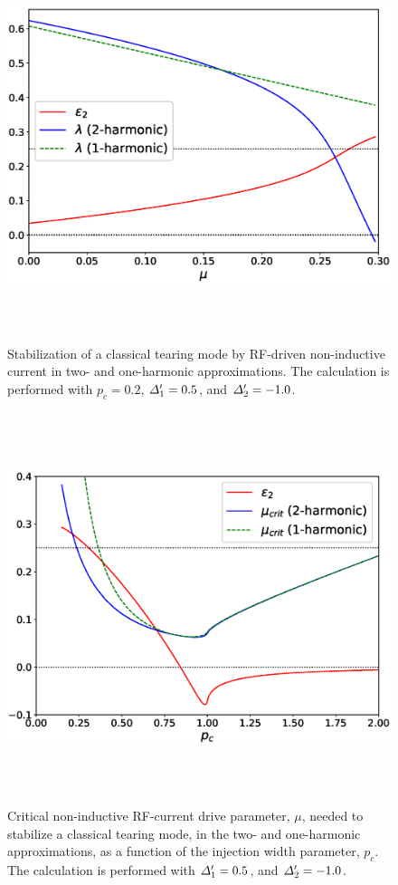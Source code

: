 \documentclass[12pt,prb,aps]{revtex4-1}
\begin{document}
\begin{figure}
\centerline{\includegraphics[height=4.5in]{Figure7.eps}}
\caption{Stabilization of a classical tearing mode by RF-driven non-inductive current in two- and one-harmonic approximations. The
calculation is performed with $p_c=0.2$, ${\mit\Delta}_1'=0.5$, and ${\mit\Delta}_2'=-1.0$.  }\label{fig7}
\end{figure}

\begin{figure}
\centerline{\includegraphics[height=4.5in]{Figure8.eps}}
\caption{Critical non-inductive RF-current drive parameter, $\mu$, needed to stabilize a classical tearing mode,  in the two- and one-harmonic approximations, as a function of the injection width parameter, $p_c$. The
calculation is performed with ${\mit\Delta}_1'=0.5$, and ${\mit\Delta}_2'=-1.0$.  }\label{fig8}
\end{figure}
\end{document}
